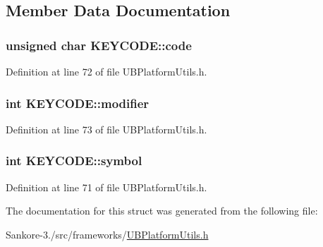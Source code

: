 \subsection{Member Data Documentation}
\hypertarget{struct_k_e_y_c_o_d_e_ad5290fbe104d6c227edbea15304141d8}{
\subsubsection[{code}]{\setlength{\rightskip}{0pt plus 5cm}unsigned char K\-E\-Y\-C\-O\-D\-E\-::code}}\label{d2/dab/struct_k_e_y_c_o_d_e_ad5290fbe104d6c227edbea15304141d8}


Definition at line 72 of file U\-B\-Platform\-Utils.\-h.

\hypertarget{struct_k_e_y_c_o_d_e_a554fd04de226019a55a6e3c91f908cee}{
\subsubsection[{modifier}]{\setlength{\rightskip}{0pt plus 5cm}int K\-E\-Y\-C\-O\-D\-E\-::modifier}}\label{d2/dab/struct_k_e_y_c_o_d_e_a554fd04de226019a55a6e3c91f908cee}


Definition at line 73 of file U\-B\-Platform\-Utils.\-h.

\hypertarget{struct_k_e_y_c_o_d_e_a4a96f7f24dadfc116f1d51b4a99a95ee}{
\subsubsection[{symbol}]{\setlength{\rightskip}{0pt plus 5cm}int K\-E\-Y\-C\-O\-D\-E\-::symbol}}\label{d2/dab/struct_k_e_y_c_o_d_e_a4a96f7f24dadfc116f1d51b4a99a95ee}


Definition at line 71 of file U\-B\-Platform\-Utils.\-h.



The documentation for this struct was generated from the following file\-:\begin{DoxyCompactItemize}
\item 
Sankore-\/3./src/frameworks/\hyperlink{_u_b_platform_utils_8h}{U\-B\-Platform\-Utils.\-h}\end{DoxyCompactItemize}
